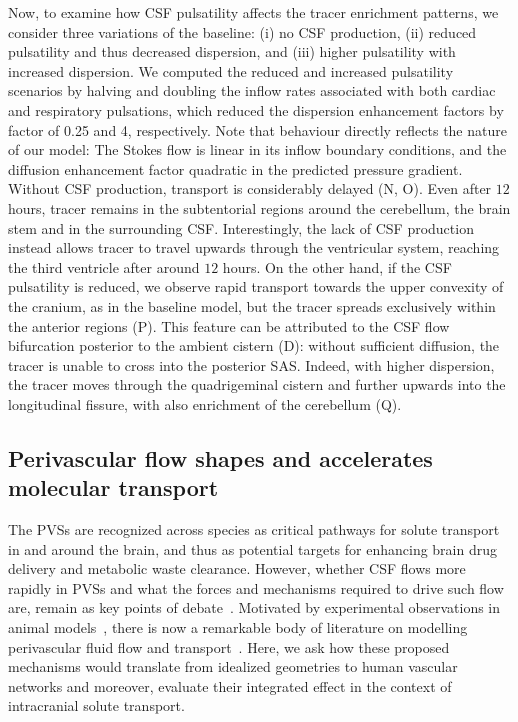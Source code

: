\documentclass[fleqn,10pt]{wlscirep}
\begin{document}
Now, to examine how CSF pulsatility affects the tracer enrichment patterns,
we consider three variations of the baseline: (i) no CSF production,
(ii) reduced pulsatility and thus decreased dispersion, and (iii) higher pulsatility with increased dispersion. We computed the reduced and increased pulsatility scenarios by halving and doubling the inflow rates associated with both cardiac and respiratory pulsations, which reduced the dispersion enhancement factors by factor of 0.25 and 4, respectively. Note that behaviour directly reflects the nature of our model: The Stokes flow is linear in its inflow boundary conditions, and the diffusion enhancement factor quadratic in the predicted pressure gradient.
Without CSF production, transport is considerably delayed
(N, O). Even after $12$ hours, tracer remains in the
subtentorial regions around the cerebellum, the brain stem and in the
surrounding CSF. Interestingly, the lack of CSF production instead
allows tracer to travel upwards through the ventricular system,
reaching the third ventricle after around $12$ hours. On the other
hand, if the CSF pulsatility is reduced, we observe rapid transport
towards the upper convexity of the cranium, as in the baseline model,
but the tracer spreads exclusively within the anterior regions
(P). This feature can be attributed to the CSF flow
bifurcation posterior to the ambient cistern (D):
without sufficient diffusion, the tracer is unable to cross into the
posterior SAS. Indeed, with higher dispersion, the tracer moves
through the quadrigeminal cistern and further upwards into the
longitudinal fissure, with also enrichment of the cerebellum
(Q).

\subsection*{Perivascular flow shapes and accelerates molecular transport}
\label{sec:pvs_flow_results}

The PVSs are recognized across species as critical pathways for solute
transport in and around the brain, and thus as potential targets for
enhancing brain drug delivery and metabolic waste clearance. However,
whether CSF flows more rapidly in PVSs and what the forces and
mechanisms required to drive such flow are, remain as key points of
debate~\cite{bohr2022glymphatic, van2024caa}. Motivated by
experimental observations in animal
models~\cite{iliff2012paravascular, iliff2013cerebral, mestre2018flow,
  bedussi2018paravascular}, there is now a remarkable body of
literature on modelling perivascular fluid flow and
transport~\cite{bilston2003arterial, asgari2016glymphatic,
  rey2018pulsatile, daversin2020mechanisms, sharp2019dispersion,
  thomas2019fluid, kedarasetti2020functional, kedarasetti2020arterial,
  troyetsky2021dispersion, martinac2021phase, gjerde2023directional,
  nozaleda2024arterial}. Here, we ask how these proposed mechanisms
would translate from idealized geometries to human vascular networks
and moreover, evaluate their integrated effect in the context of
intracranial solute transport.
\end{document}
